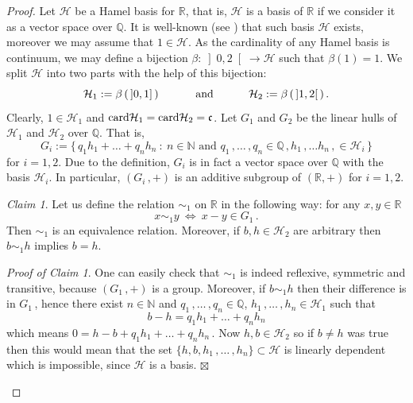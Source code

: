 \documentclass[12pt]{amsart}
\theoremstyle{remark}
\newtheorem{claim}{Claim}
\newtheorem{prclm}{Proof of Claim}
\theoremstyle{definition}
\newcommand{\dlth}{\mathcal{H}}
\newcommand{\NN}{\mathbb{N}}
\newcommand{\QQ}{\mathbb{Q}}
\newcommand{\RR}{\mathbb{R}}
\newcommand{\cnc}{\mathfrak{c}}
\newcommand{\card}{\mbox{\rm card}}
\newcommand{\map}{\longrightarrow}
\begin{document}
\begin{proof}
Let $ \dlth $ be a Hamel basis for $ \RR $, 
that is, $ \dlth $ is a basis of $ \RR $ 
if we consider it as a vector space over $ \QQ $. 
It is well-known 
(see \cite[Theorem 4.2.1.]{Kuc09}) that such basis 
$ \dlth $ exists, moreover we may assume that 
$ 1 \in \dlth $. 
As the cardinality of any Hamel basis 
is continuum, we may define a bijection 
$ \beta : \left] 0, 2 \right[ \map \dlth $ 
such that $ \beta(1) = 1 $. 
We split $ \dlth $ into two parts 
with the help of this bijection:  
\[
\dlth_1 := \beta \left( \, 
\left] 0,1 \right] \, \right) 
\hspace{10mm} \mbox{ and } \hspace{10mm} 
\dlth_2 := \beta \left( \, 
\left] 1,2 \right[ \, \right). 
\]
Clearly, $ 1 \in \dlth_1 $ and 
$ \card \dlth_1 = \card \dlth_2 = \cnc $. 
Let $ G_1 $ and $ G_2 $ be the linear hulls of 
$ \dlth_1 $ and $ \dlth_2 $ over $ \QQ $. 
That is, 
\[
G_i := 
\lbrace \, 
q_1 h_1 + \dots + q_n h_n \ : \ 
n \in \NN \mbox{ and } 
q_1 \,, \dots \,, q_n \in \QQ \,, 
h_1 \,, \dots h_n \,, \in \dlth_i 
\, \rbrace
\]
for $ i = 1,2 $. 
Due to the definition, $ G_i $ is in fact a 
vector space over $ \QQ $ with the basis $ \dlth_i $. 
In particular, $ \left( G_i \,, + \right) $ is an 
additive subgroup of $ \left( \RR , + \right) $ 
for $ i=1,2 $. 

\begin{claim}\label{clm-ekv1}
Let us define the relation 
$ \sim_1 $ on $ \RR $ 
in the following way: 
for any $ x,y \in \RR $ 
\[
x \sim_1 y \ \Longleftrightarrow \ x-y \in G_1 \, . 
\]
Then $ \sim_1 $ is an equivalence relation. 
Moreover, if $ b,h \in \dlth_2 $ 
are arbitrary then 
$ b \sim_1 h $ implies $ b = h $. 
\end{claim} 

\begin{prclm}
One can easily check that $ \sim_1 $ is indeed 
reflexive, symmetric and transitive, 
because $ \left( G_1 \,, + \right) $ is a group. 
Moreover, if $ b \sim_1 h $ then 
their difference is in $ G_1 \,$, 
hence there exist $ n \in \NN $ and 
$ q_1 \,, \dots \,, q_n \in \QQ $, 
$ h_1 \,, \dots \,, h_n \in \dlth_1 $ such that 
\[
b-h = q_1 h_1 + \dots + q_n h_n 
\] 
which means 
$ 0 = h - b + q_1 h_1 + \dots + q_n h_n \,$. 
Now $ h, b \in \dlth_2 $ so if 
$ b \neq h $ was true then this would mean that the set 
$ \lbrace h, b, h_1 \,, \dots \,, h_n \rbrace 
\subset \dlth $ 
is linearly dependent which is impossible, since 
$ \dlth $ is a basis. 
\hfill $ \boxtimes $ 
\end{prclm}


\end{proof}
\end{document}
